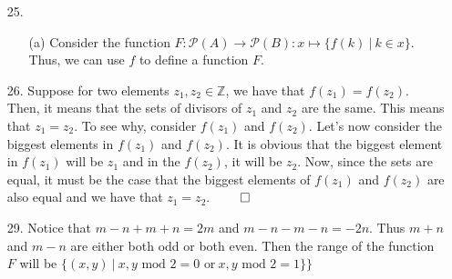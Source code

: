 \documentclass[12pt, a4paper]{article}
\newcommand{\ints}{\mathbb{Z}}
\newcommand{\rarr}{\rightarrow}
\begin{document}
\begin{itemize}
\item[]
\item[]

\item[25.]
\begin{itemize}
\item[(a)]
Consider the function $F : \mathcal{P}(A) \rarr \mathcal{P}(B) : x \mapsto \{f(k) \ | \ k \in x\}$.
Thus, we can use $f$ to define a function $F$.
\end{itemize}

\item[]
\item[]

\item[26.]
Suppose for two elements $z_1, z_2 \in \ints$, we have that $f(z_1) = f(z_2)$.
Then, it means that the sets of divisors of $z_1$ and $z_2$ are the same. This means that $z_1 = z_2$.
To see why, consider $f(z_1)$ and $f(z_2)$. Let's now consider the biggest elements in $f(z_1)$ and $f(z_2)$.
It is obvious that the biggest element in $f(z_1)$ will be $z_1$ and in the $f(z_2)$, it will be $z_2$.
Now, since the sets are equal, it must be the case that the biggest elements of $f(z_1)$ and $f(z_2)$ are also
equal and we have that $z_1 = z_2$.
$\qed$

\item[]
\item[]

\item[29.]
Notice that $m - n + m + n = 2m$ and $m - n - m - n = -2n$. Thus $m + n$
and $m - n$ are either both odd or both even. Then the range of the function $F$
will be $\{(x, y) \ | \ x, y \mbox{ mod } 2 = 0 \mbox{ or} \ x, y \mbox{ mod } 2 = 1\} \}$\\\\
\end{itemize}
\end{document}
